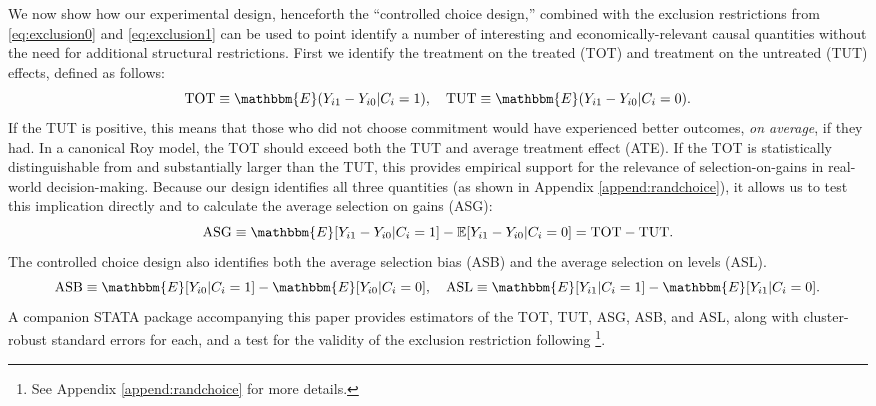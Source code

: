 \documentclass[oneside,11pt]{article}
\begin{document}
We now show how our experimental design, henceforth the ``controlled choice design,'' combined with the exclusion restrictions from \eqref{eq:exclusion0} and \eqref{eq:exclusion1} can be used to point identify a number of interesting and economically-relevant causal quantities without the need for additional structural restrictions.
First we identify the treatment on the treated (TOT) and treatment on the untreated (TUT) effects, defined as follows:
\[
\text{TOT} \equiv \mathbbm{E}(Y_{i1} - Y_{i0} | C_i = 1), \quad
\text{TUT} \equiv \mathbbm{E}(Y_{i1} - Y_{i0} | C_i = 0).
\]
If the TUT is positive, this means that those who did not choose commitment would have experienced better outcomes, \emph{on average}, if they had. 
In a canonical Roy model, the TOT should exceed both the TUT and average treatment effect (ATE).
If the TOT is statistically distinguishable from and substantially larger than the TUT, this provides empirical support for the relevance of selection-on-gains in real-world decision-making.
Because our design identifies all three quantities (as shown in Appendix \ref{append:randchoice}), it allows us to test this implication directly and to calculate the average selection on gains (ASG):
\[
\text{ASG} \equiv \mathbbm{E}[Y_{i1} - Y_{i0}|C_i = 1] - \mathbb{E}[Y_{i1} - Y_{i0} | C_i = 0] = \text{TOT} - \text{TUT}.
\]
The controlled choice design also identifies both the average selection bias (ASB) and the average selection on levels (ASL). 
\[
\text{ASB} \equiv \mathbbm{E}[Y_{i0}|C_i = 1] - \mathbbm{E}[Y_{i0}|C_i = 0], \quad 
\text{ASL} \equiv \mathbbm{E}[Y_{i1}|C_i = 1] - \mathbbm{E}[Y_{i1}|C_i = 0].
\]
A companion STATA package accompanying this paper provides estimators of the TOT, TUT, ASG, ASB, and ASL, along with cluster-robust standard errors for each, and a test for the validity of the exclusion restriction following \cite{huber_mellace} \footnote{See Appendix \ref{append:randchoice} for more details.}.
\end{document}

